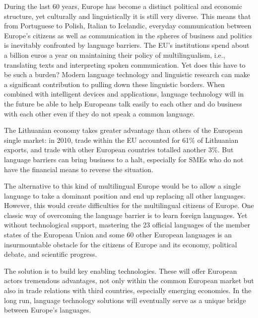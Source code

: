 \begin{multicols}{2}

During the last 60 years, Europe has become a distinct political and economic structure, yet culturally and linguistically it is still very diverse. This means that from Portuguese to Polish, Italian to Icelandic, everyday communication between Europe’s citizens as well as communication in the spheres of business and politics is inevitably confronted by language barriers. The EU’s institutions spend about a billion euros a year on maintaining their policy of multilingualism, i.e., translating texts and interpreting spoken communication. Yet does this have to be such a burden? Modern language technology and linguistic research can make a significant contribution to pulling down these linguistic borders. When combined with intelligent devices and applications, language technology will in the future be able to help Europeans talk easily to each other and do business with each other even if they do not speak a common language.


The Lithuanian economy takes greater advantage than others of the European single market: in 2010, trade within the EU accounted for 61\% of Lithuanian exports, and trade with other European countries totalled another 3\%. But language barriers can bring business to a halt, especially for SMEs who do not have the financial means to reverse the situation.

The alternative to this kind of multilingual Europe would be to allow a single language to take a dominant position and end up replacing all other languages. However, this would create difficulties for the multilingual citizens of Europe.
One classic way of overcoming the language barrier is to learn foreign languages. Yet without technological support, mastering the 23 official languages of the member states of the European Union and some 60 other European languages is an insurmountable obstacle for the citizens of Europe and its economy, political debate, and scientific progress.

The solution is to build key enabling technologies. These will offer European actors tremendous advantages, not only within the common European market but also in trade relations with third countries, especially emerging economies. In the long run, language technology solutions will eventually serve as a unique bridge between Europe’s languages.



\end{multicols}
